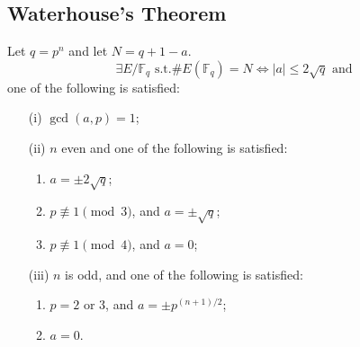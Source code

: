 \documentclass[10pt,handout]{beamer}%
\newcommand{\F}{\mathbb F}
\theoremstyle{definition}
\begin{document}
\subsection{Waterhouse's Theorem}
\begin{frame}[label=current]
\begin{theorem}[Waterhouse]\pause
\label{lem:Water}
 Let $q=p^n$ and let $N = q + 1-a$.
 $$\exists E/\F_q\text{ s.t.}\#E(\F_q) = N\Leftrightarrow|a|\le 2\sqrt q\text{ and}$$
 one of the following is satisfied:\pause
\begin{itemize}[<+-| alert@+>]
\item[(i)] $\gcd(a, p) = 1$;
\item[(ii)] $n$ even and one of the following is satisfied:
\begin{enumerate}
  \item $a=\pm 2\sqrt q$;
  \item $p\not\equiv 1 \pmod 3$, and $a = \pm\sqrt q$;
  \item $p\not\equiv 1 \pmod 4$, and $a = 0$;
\end{enumerate}
\item[(iii)] $n$ is odd, and one of the following is satisfied:
 \begin{enumerate}
   \item $p = 2$ or $3$, and $a = \pm p^{(n+1)/2}$;
   \item $a = 0$.
 \end{enumerate}
 \end{itemize}
\end{theorem}


\end{frame}
\end{document}
